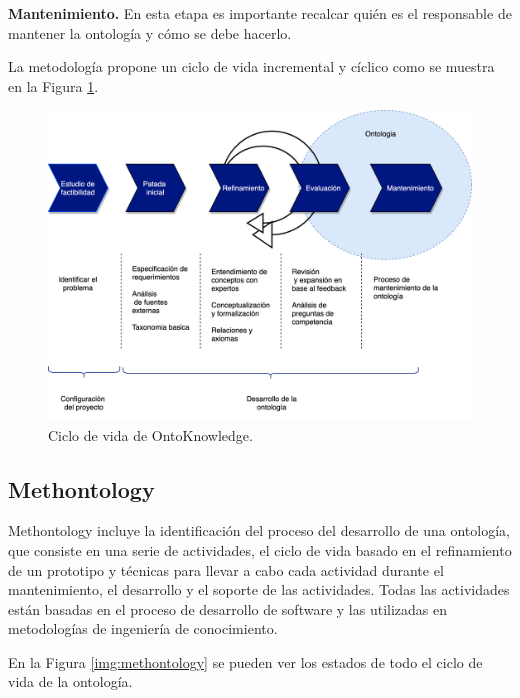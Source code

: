 \textbf{Mantenimiento.} En esta etapa es importante recalcar quién es el responsable de mantener la ontología y cómo se debe hacerlo.

La metodología propone un ciclo de vida incremental y cíclico como se muestra en la Figura \ref{img:ontoknowledge}.

\begin{figure}[h!]
    \centering
    \includegraphics[width=150mm]{figuras/Diagramas-OntoKnowledgeProcess}
    \caption{Ciclo de vida de OntoKnowledge. \cite{ontoKnowledgeFig}}
    \label{img:ontoknowledge}
    \end{figure}

\subsection{Methontology}
\label{subsection:methontology}

Methontology\cite{fernandez1997methontology} incluye la identificación del proceso del desarrollo de una ontología, que consiste en una serie de actividades, el ciclo de vida basado en el refinamiento de un prototipo y técnicas para llevar a cabo cada actividad durante el mantenimiento, el desarrollo y el soporte de las actividades. Todas las actividades están basadas en el proceso de desarrollo de software y las utilizadas en metodologías de ingeniería de conocimiento.

En la Figura \ref{img:methontology} se pueden ver los estados de todo el ciclo de vida de la ontología.

